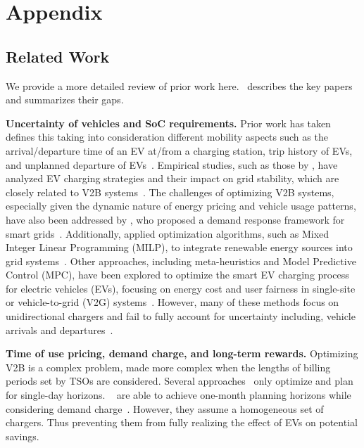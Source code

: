 \section{Appendix}



\subsection{Related Work}

We provide a more detailed review of prior work here.~ describes the key papers and summarizes their gaps.

\noindent\textbf{Uncertainty of vehicles and SoC requirements.} Prior work has taken \citeauthor{MJG2015} defines this taking into consideration different mobility aspects such as the arrival/departure time of an EV at/from a charging station, trip history of EVs, and unplanned departure of EVs~\cite{MJG2015}. Empirical studies, such as those by \citeauthor{richardson2011electric}, have analyzed EV charging strategies and their impact on grid stability, which are closely related to V2B systems~\cite{richardson2011electric}. 
The challenges of optimizing V2B systems, especially given the dynamic nature of energy pricing and vehicle usage patterns, have also been addressed by \citeauthor{8274175}, who proposed a demand response framework for smart grids~\cite{8274175}. Additionally, \citeauthor{oconnell2010integration} applied optimization algorithms, such as Mixed Integer Linear Programming (MILP), to integrate renewable energy sources into grid systems~\cite{oconnell2010integration}. 
{\color{black} Other approaches, including meta-heuristics and Model Predictive Control (MPC), have been explored to optimize the smart EV charging process for electric vehicles (EVs), focusing on energy cost and user fairness in single-site or vehicle-to-grid (V2G) systems~\cite{AORC2013, 5986769, 9409126, MJG2015}.} 
However, many of these methods focus on unidirectional chargers and fail to fully account for uncertainty including, vehicle arrivals and departures~\cite{MJG2015}. 



\noindent\textbf{Time of use pricing, demand charge, and long-term rewards.} 
Optimizing V2B is a complex problem, made more complex when the lengths of billing periods set by TSOs are considered. Several approaches~\cite{AORC2013, MMN2019, SNDJ2020} only optimize and plan for single-day horizons. ~\citeauthor{9409126} are able to achieve one-month planning horizons while considering demand charge~\cite{9409126}. However, they assume a homogeneous set of chargers. Thus preventing them from fully realizing the effect of EVs on potential savings.

